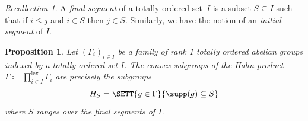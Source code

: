 \documentclass{amsart}
\numberwithin{equation}{section}%
\newtheorem{Prop}[equation]{Proposition}
\theoremstyle{remark}
\newtheorem{Rec}[equation]{Recollection}
\begin{document}
\begin{Rec}
  A \emph{final segment} of a totally ordered set~$I$ is a subset $S \subseteq I$ such that if $i \le j$ and $i \in S$ then $j \in S$. Similarly, we have the notion of an \emph{initial segment} of $I$.
\end{Rec}

\begin{Prop}\label{prop:hahn-product-of-archimedean}
	Let $(\Gamma_i)_{i \in I}$ be a family of rank 1 totally ordered abelian groups indexed by a totally ordered set $I$. The convex subgroups of the Hahn product $\Gamma \coloneqq \prod_{i \in I}^{\mathrm{lex}}\Gamma_i$ are precisely the subgroups
	\[
		H_S=\SETT{g\in\Gamma}{\supp(g)\subseteq S}
	\]
	where $S$ ranges over the final segments of $I$.
\end{Prop}
\end{document}
